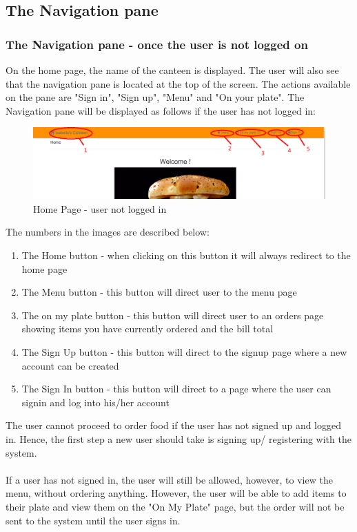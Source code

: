 \documentclass[a4paper,12pt]{report}
\begin{document}
\subsection{The Navigation pane} 

\subsubsection{The Navigation pane - once the user is not  logged on}
On the home page, the name of the canteen is displayed. The user will also see that the navigation pane is located at the top of the screen. The actions available on the pane are "Sign in", "Sign up", "Menu" and "On your plate". 
The Navigation pane will be displayed as follows if the user has not logged in:

\begin{figure}[H]
  \centering
    \includegraphics[width=1.0\textwidth]{screenshots/HomePage.PNG}
    \caption{Home Page - user not logged in } 
\end{figure}

The numbers in the images are described below:

\begin{enumerate}
\item The Home button - when clicking on this button it will always redirect to the home page
\item The Menu button - this button will direct user to the menu page
\item The on my plate button - this button will direct user to an orders page showing items you have currently ordered and the bill total
\item The Sign Up button - this button will direct to the signup page where a new account can be created
\item The Sign In button - this button will direct to a page where the user can signin and log into his/her account
\end{enumerate}

The user cannot proceed to order food if the user has not signed up and logged in. Hence, the first step a new user should take is signing up/ registering with the system. 
\\ \\
If a user has not signed in, the user will still be allowed, however, to view the menu, without ordering anything. However, the user will be able to add items to their plate and view them on the "On My Plate" page, but the order will not be sent to the system until the user signs in.
\end{document}
